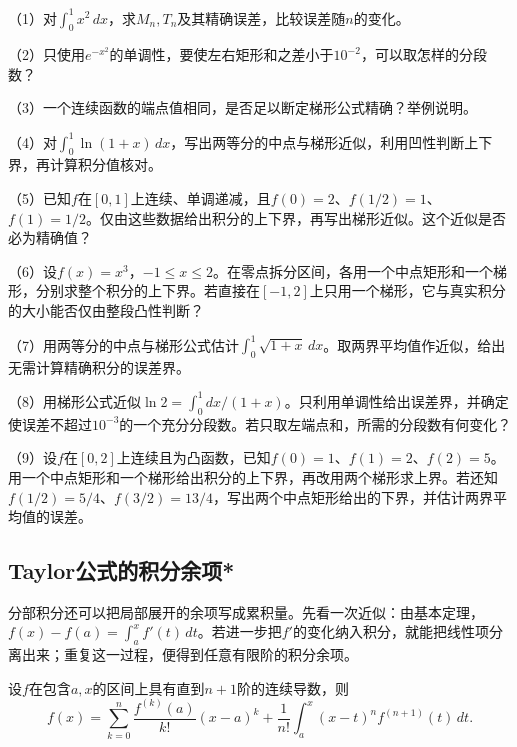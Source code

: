 \begin{exercise}
\mbox{}\par\nobreak

（1）对\(\int_0^1x^2\,dx\)，求\(M_n,T_n\)及其精确误差，比较误差随\(n\)的变化。

（2）只使用\(e^{-x^2}\)的单调性，要使左右矩形和之差小于\(10^{-2}\)，可以取怎样的分段数？

（3）一个连续函数的端点值相同，是否足以断定梯形公式精确？举例说明。

（4）对\(\int_0^1\ln(1+x)\,dx\)，写出两等分的中点与梯形近似，利用凹性判断上下界，再计算积分值核对。

（5）已知\(f\)在\([0,1]\)上连续、单调递减，且\(f(0)=2\)、\(f(1/2)=1\)、\(f(1)=1/2\)。仅由这些数据给出积分的上下界，再写出梯形近似。这个近似是否必为精确值？

（6）设\(f(x)=x^3\)，\(-1\le x\le2\)。在零点拆分区间，各用一个中点矩形和一个梯形，分别求整个积分的上下界。若直接在\([-1,2]\)上只用一个梯形，它与真实积分的大小能否仅由整段凸性判断？

（7）用两等分的中点与梯形公式估计\(\int_0^1\sqrt{1+x}\,dx\)。取两界平均值作近似，给出无需计算精确积分的误差界。

（8）用梯形公式近似\(\ln2=\int_0^1dx/(1+x)\)。只利用单调性给出误差界，并确定使误差不超过\(10^{-3}\)的一个充分分段数。若只取左端点和，所需的分段数有何变化？

（9）设\(f\)在\([0,2]\)上连续且为凸函数，已知\(f(0)=1\)、\(f(1)=2\)、\(f(2)=5\)。用一个中点矩形和一个梯形给出积分的上下界，再改用两个梯形求上界。若还知\(f(1/2)=5/4\)、\(f(3/2)=13/4\)，写出两个中点矩形给出的下界，并估计两界平均值的误差。

\end{exercise}

\endgroup
\FloatBarrier
\newpage
\begingroup
\setlength{\parskip}{4pt}
\setlength{\abovedisplayskip}{10pt}
\setlength{\belowdisplayskip}{10pt}
\subsection{Taylor公式的积分余项*}

分部积分还可以把局部展开的余项写成累积量。先看一次近似：由基本定理，\(f(x)-f(a)=\int_a^xf'(t)\,dt\)。若进一步把\(f'\)的变化纳入积分，就能把线性项分离出来；重复这一过程，便得到任意有限阶的积分余项。

\begin{theorem}\label{thm:calculus-taylor-integral}
设\(f\)在包含\(a,x\)的区间上具有直到\(n+1\)阶的连续导数，则
\begin{equation}\label{eq:calculus-taylor-integral-remainder}
 f(x)=\sum_{k=0}^n\frac{f^{(k)}(a)}{k!}(x-a)^k
 +\frac1{n!}\int_a^x(x-t)^nf^{(n+1)}(t)\,dt.
\end{equation}
\end{theorem}


